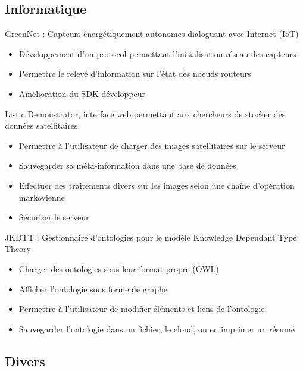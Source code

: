 \documentclass[10pt,a4paper,sans]{moderncv}        %
\begin{document}
\subsection{Informatique}
	{GreenNet : Capteurs énergétiquement autonomes dialoguant avec Internet
		(IoT)
	\begin{itemize}
		\item Développement d'un protocol permettant l'initialisation réseau des
			capteurs
		\item Permettre le relevé d'information sur l'état des noeuds routeurs
		\item Amélioration du SDK développeur
	\end{itemize}
	}
	{Listic Demonstrator, interface web permettant aux chercheurs de stocker des
	données satellitaires
	\begin{itemize}
		\item Permettre à l'utilisateur de charger des images satellitaires sur
			le serveur
		\item Sauvegarder sa méta-information dans une base de données
		\item Effectuer des traitements divers sur les images selon une chaîne
			d'opération markovienne
		\item Sécuriser le serveur
	\end{itemize}
	}
	{JKDTT : Gestionnaire d'ontologies pour le modèle Knowledge Dependant Type
		Theory
	\begin{itemize}
		\item Charger des ontologies sous leur format propre (OWL)
		\item Afficher l'ontologie sous forme de graphe
		\item Permettre à l'utilisateur de modifier éléments et liens de
			l'ontologie
		\item Sauvegarder l'ontologie dans un fichier, le cloud, ou en imprimer
			un résumé
	\end{itemize}
	}
\subsection{Divers}
\end{document}

